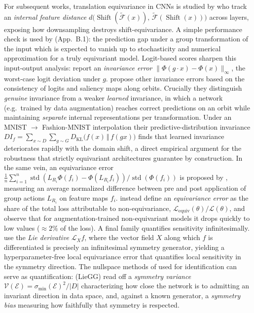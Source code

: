\documentclass[mathematics,review,submit,moreauthors]{Definitions/mdpi}
\begin{document}
For subsequent works, translation equivariance in CNNs is studied by \citet{zhang2019p3icml} who track an \emph{internal feature distance} $d\big(\operatorname{Shift}(\widetilde{\mathcal{F}}(x)),\,\widetilde{\mathcal{F}}(\operatorname{Shift}(x))\big)$ across layers, exposing how downsampling destroys shift-equivariance.
A simple performance check is used by \citet{finzi2020p3icml} (App.~B.1): the prediction gap under a group transformation of the input which is expected to vanish up to stochasticity and numerical approximation for a truly equivariant model.
Logit-based scores sharpen this input-output analysis: \citet{hutchinson2021p3icml} report an \emph{invariance error} $\lVert \Phi(g\cdot x) - \Phi(x)\rVert_\infty$, the worst-case logit deviation under $g$.
\citet{moskalev2023p2awtagmlt} propose other invariance errors based on the consistency of logits and saliency maps along orbits.
Crucially they distinguish \emph{genuine} invariance from a weaker \emph{learned} invariance, in which a network (e.g.\ trained by data augmentation) reaches correct predictions on an orbit while maintaining \emph{separate} internal representations per transformation.
Under an MNIST $\to$ Fashion-MNIST interpolation their predictive-distribution invariance $DI_f = \sum_{x\sim D}\sum_{g\sim G} D_{\mathrm{KL}}\big(f(x)\,\Vert\,f(gx)\big)$ finds that learned invariance deteriorates rapidly with the domain shift, a direct empirical argument for the robustness that strictly equivariant architectures guarantee by construction.
In the same vein, an equivariance error $\frac{1}{n} \sum_{i=1}^{n} \operatorname{std}(L_{R_i} \Phi(f_i) - \Phi(L_{R_i} f_i)) / \operatorname{std}(\Phi(f_i))$ is proposed by \citet{cohen2018}, measuring an average normalized difference between pre and post application of group actions $L_{R_i}$ on feature maps $f_i$.
\citet{shen2026} instead define an \emph{equivariance error} as the share of the total loss attributable to non-equivariance, $\mathcal{L}_{\mathrm{equiv}}(\theta)/\mathcal{L}(\theta)$, and observe that for augmentation-trained non-equivariant models it drops quickly to low values ($\approx 2\%$ of the loss).\newline
A final family quantifies sensitivity infinitesimally.
\citet{gruver2024} use the \emph{Lie derivative} $\mathcal{L}_X f$, where the vector field $X$ along which $f$ is differentiated is precisely an infinitesimal symmetry generator, yielding a hyperparameter-free local equivariance error that quantifies local sensitivity in the symmetry direction.
The nullspace methods of  used for identification can serve as quantification: \citet{moskalev2023} (LieGG) read off a \emph{symmetry variance} $\mathcal{V}(\mathcal{E}) = \sigma_{\min}(\mathcal{E})^2/|D|$ characterizing how close the network is to admitting an invariant direction in data space, and, against a known generator, a \emph{symmetry bias} measuring how faithfully that symmetry is respected.
\end{document}
